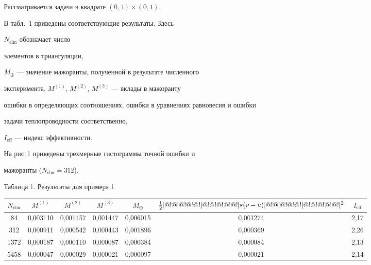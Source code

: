 \begin{exam}


Рассматривается задача в квадрате $(0,1)\times (0,1)$.





В табл.~1 приведены соответствующие результаты. Здесь


$N_{\text{elm}}$ обозначает число


элементов в триангуляции,


$M_\oplus$ --- значение мажоранты, полученной в результате численного


эксперимента, $M^{(1)}$, $M^{(2)}$, $M^{(3)}$ --- вклады в мажоранту


ошибки в определяющих соотношениях, ошибки в уравнениях равновесия и ошибки


задачи теплопроводности соответственно,


$I_{\text{eff}}$ --- индекс эффективности.


На рис.\,1 приведены трехмерные гистограммы точной ошибки и


мажоранты ($N_{\text{elm}}=312$).


\smallskip





\begin{center}


Таблица 1. Результаты для примера 1


\smallskip





\begin{tabular}{|c|c|c|c|c|c|c|}


\hline


$N_{\text{elm}}$ & $M^{(1)}$ & $M^{(2)}$


& $M^{(3)}$ & $M_\oplus$ & $\frac{1}{2}| @!@!@!@!@! | @!@!@!@!@! | \varepsilon(v-u) | @!@!@!@!@! | @!@!@!@!@! |^2$


& $I_{\text{eff}}$ \\ \hline


84 & 0,003110 & 0,001457 & 0,001447 & 0,006015 & 0,001274 & 2,17 \\ \hline


312 & 0,000911 & 0,000542 & 0,000443 & 0,001896 & 0,000369 & 2,26 \\ \hline


1372 & 0,000187 & 0,000110 & 0,000087 & 0,000384 & 0,000084 & 2,13 \\ \hline


5458 & 0,000047 & 0,000029 & 0,000021 & 0,000097 & 0,000021 & 2,14 \\ \hline



\end{tabular}
\end{center}
\end{exam}
